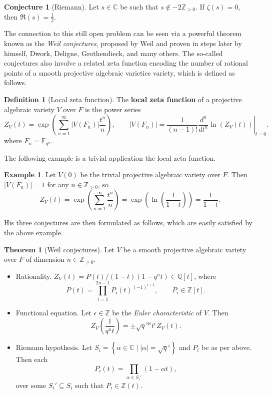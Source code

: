 \documentclass{article}
\newcommand{\F}{\mathbb{F}}
\newcommand{\Z}{\mathbb{Z}}
\newcommand{\Q}{\mathbb{Q}}
\newcommand{\C}{\mathbb{C}}
\newcommand{\val}[1]{\left. #1 \right\rvert}
\newcommand{\rb}[1]{\left( #1 \right)}
\renewcommand{\sb}[1]{\left[ #1 \right]}
\newcommand{\cb}[1]{\left\{ #1 \right\}}
\newcommand{\abs}[1]{\left\lvert #1 \right\rvert}
\theoremstyle{definition}
\newtheorem*{definition}{Definition}
\newtheorem*{example}{Example}
\newtheorem{theorem}[proposition]{Theorem}
\newtheorem{conjecture}[proposition]{Conjecture}
\begin{document}
\begin{conjecture}[Riemann]
Let $ s \in \C $ be such that $ s \notin -2\Z_{> 0} $. If $ \zeta\rb{s} = 0 $, then $ \Re\rb{s} = \tfrac{1}{2} $.
\end{conjecture}

The connection to this still open problem can be seen via a powerful theorem known as the \emph{Weil conjectures}, proposed by Weil and proven in steps later by himself, Dwork, Deligne, Grothendieck, and many others. The so-called conjectures also involve a related zeta function encoding the number of rational points of a smooth projective algebraic varieties variety, which is defined as follows.

\begin{definition}[Local zeta function]
The \textbf{local zeta function} of a projective algebraic variety $ V $ over $ F $ is the power series
$$ Z_V\rb{t} = \exp\rb{\sum_{n = 1}^\infty \abs{V\rb{F_n}}\dfrac{t^n}{n}}, \qquad \abs{V\rb{F_n}} = \dfrac{1}{\rb{n - 1}!}\val{\dfrac{d^n}{dt^n}\ln\rb{Z_V\rb{t}}}_{t = 0}. $$
where $ F_n = \F_{q^n} $.
\end{definition}

The following example is a trivial application the local zeta function.

\begin{example}
Let $ V\rb{0} $ be the trivial projective algebraic variety over $ F $. Then $ \abs{V\rb{F_n}} = 1 $ for any $ n \in \Z_{> 0} $, so
$$ Z_V\rb{t} = \exp\rb{\sum_{n = 1}^\infty \dfrac{t^n}{n}} = \exp\rb{\ln\rb{\dfrac{1}{1 - t}}} = \dfrac{1}{1 - t}. $$
\end{example}

His three conjectures are then formulated as follows, which are easily satisfied by the above example.

\begin{theorem}[Weil conjectures]
\label{thm:weil}
Let $ V $ be a smooth projective algebraic variety over $ F $ of dimension $ n \in \Z_{\ge 0} $.
\begin{itemize}
\item Rationality. $ Z_V\rb{t} = P\rb{t} / \rb{1 - t}\rb{1 - q^nt} \in \Q\sb{t} $, where
$$ P\rb{t} = \prod_{i = 1}^{2n - 1} P_i\rb{t}^{\rb{-1}^{i + 1}}, \qquad P_i \in \Z\sb{t}. $$
\item Functional equation. Let $ \epsilon \in \Z $ be the \emph{Euler characteristic} of $ V $. Then
$$ Z_V\rb{\dfrac{1}{q^nt}} = \pm \sqrt{q}^{n\epsilon} t^\epsilon Z_V\rb{t}. $$
\item Riemann hypothesis. Let $ S_i = \cb{\alpha \in \C \mid \abs{\alpha} = \sqrt{q}^i} $ and $ P_i $ be as per above. Then each
$$ P_i\rb{t} = \prod_{\alpha \in S_i'} \rb{1 - \alpha t}, $$
over some $ S_i' \subseteq S_i $ such that $ P_i \in \Z\rb{t} $.
\end{itemize}
\end{theorem}
\end{document}
